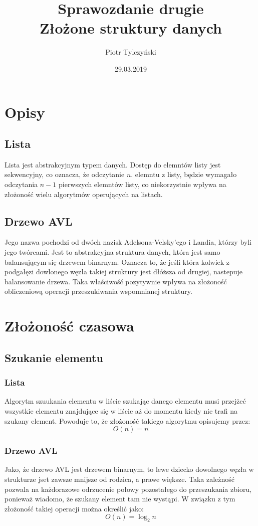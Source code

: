 \documentclass[]{article}
\title{{{\normalsize Sprawozdanie drugie} \\
		{\huge Złożone struktury danych}}}
\author{Piotr Tylczyński}
\date{29.03.2019}
\begin{document}
\maketitle
\pagebreak

\section{Opisy}
	\subsection{Lista}
		Lista jest abstrakcyjnym typem danych. Dostęp do elemntów listy jest sekwencyjny, co oznacza, że odczytanie $ n. $ elemntu z listy, będzie wymagało odczytania $ n-1 $ pierwszych elemntów listy, co niekorzystnie wpływa na złożoność wielu algorytmów operujących na listach.
	\subsection{Drzewo AVL}
		Jego nazwa pochodzi od dwóch nazisk Adelsona-Velsky'ego i Landia, którzy byli jego twórcami. Jest to abstrakcyjna struktura danych, która jest samo balansującym się drzewem binarnym. Oznacza to, że jeśli która kolwiek z podgałęzi dowlonego węzła takiej struktury jest dłóższa od drugiej, nastepuje balansowanie drzewa. Taka właściwość pozytywnie wpływa na złożoność obliczeniową operacji przeszukiwania wspomnianej struktury.

\pagebreak
		
\section{Złożoność czasowa}
	\subsection{Szukanie elementu}
		\subsubsection{Lista}
			Algorytm szuukania elementu w liście szukając danego elementu musi przejżeć wszystkie elementu znajdujące się w liście aż do momentu kiedy nie trafi na szukany element. Powoduje to, że złożoność takiego algorytmu opisujemy przez:
			\[
				O(n) = n
			\]
		\subsubsection{Drzewo AVL}
			Jako, że drzewo AVL jest drzewem binarnym, to lewe dziecko dowolnego węzła w strukturze jset zawsze mnijsze od rodzica, a prawe większe. Taka zależność pozwala na każdorazowe odrzucenie połowy pozostałego do przeszukania zbioru, ponieważ wiadomo, że szukany element tam nie wystąpi. W związku z tym złożoność takiej operacji można określić jako:
			\[
			O(n) = \log_2{n}
			\]
			
\end{document}
